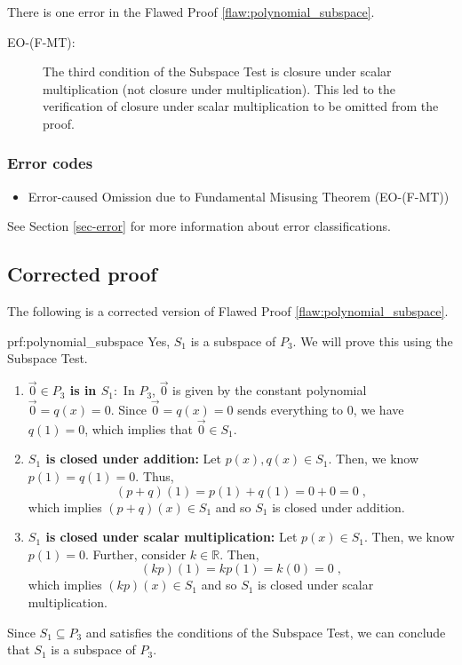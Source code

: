 
There is one error
 in the Flawed Proof \ref{flaw:polynomial_subspace}. %


 \begin{description}
 	\item[EO-(F-MT):] The third condition of the Subspace Test is closure under scalar multiplication (not closure under multiplication). This led to the verification of closure under scalar multiplication to be omitted from the proof.
 \end{description}


\subsubsection{Error codes}
\begin{itemize}
	\item 	Error-caused Omission due to Fundamental Misusing Theorem (EO-(F-MT))
\end{itemize}
See Section \ref{sec-error} for more information about error classifications.

\clearpage
\subsection{Corrected proof}

The following is a corrected version of Flawed Proof \ref{flaw:polynomial_subspace}. %

\begin{prf}{prf:polynomial_subspace} %
Yes, $S_1$ is a subspace of $P_3.$ We will prove this using the Subspace Test.

\begin{enumerate}
    \item \textbf{$\vec{0} \in P_3$ is in $S_1:$} In $P_3$, $\vec{0}$ is given by the constant polynomial $\vec{0} = q(x) = 0.$ Since $\vec{0} = q(x) = 0$ sends everything to 0, we have $q(1) = 0$, which implies that $\vec{0} \in S_1.$
    \item \textbf{$S_1$ is closed under addition:} Let $p(x), q(x) \in S_1.$ Then,  we know $p(1) = q(1) = 0.$ Thus,
    $$(p+q)(1) = p(1) + q(1) = 0 + 0 = 0\;,$$
    which implies $(p+q)(x) \in S_1$ and so $S_1$ is closed under addition.
    \item \textbf{$S_1$ is closed under scalar multiplication:} Let $p(x) \in S_1.$ Then, we know $p(1) = 0.$ Further, consider $k \in \mathbb{R}.$ Then,
    $$(kp)(1)=kp(1)=k(0)=0 \;,$$
    which implies $(kp)(x) \in S_1$ and so $S_1$ is closed under scalar multiplication.
\end{enumerate}
Since $S_1 \subseteq P_3$ and satisfies the conditions of the Subspace Test, we can conclude that $S_1$ is a subspace of $P_3$.
\end{prf}
